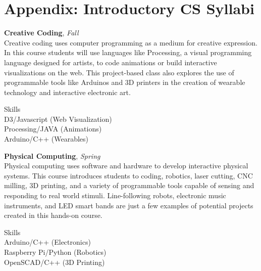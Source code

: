\chapter{Appendix: Introductory CS Syllabi} %

\label{AppendixINTRO} %



\textbf{Creative Coding}, \textit{Fall} \\
Creative coding uses computer programming as a medium for creative expression. In this course students will use languages like Processing, a visual programming language designed for artists, to code animations or build interactive visualizations on the web. This project-based class also explores the use of programmable tools like Arduinos and 3D printers in the creation of wearable technology and interactive electronic art. \par
Skills\\
D3/Javascript (Web Visualization)\\
Processing/JAVA (Animations)\\
Arduino/C++ (Wearables) \par
\textbf{Physical Computing}, \textit{Spring} \\
Physical computing uses software and hardware to develop interactive physical systems. This course introduces students to coding, robotics, laser cutting, CNC milling, 3D printing, and a variety of programmable tools capable of sensing and responding to real world stimuli. Line-following robots, electronic music instruments, and LED smart bands are just a few examples of potential projects created in this hands-on course. \par
Skills \\
Arduino/C++ (Electronics) \\
Raspberry Pi/Python (Robotics) \\
OpenSCAD/C++ (3D Printing)
